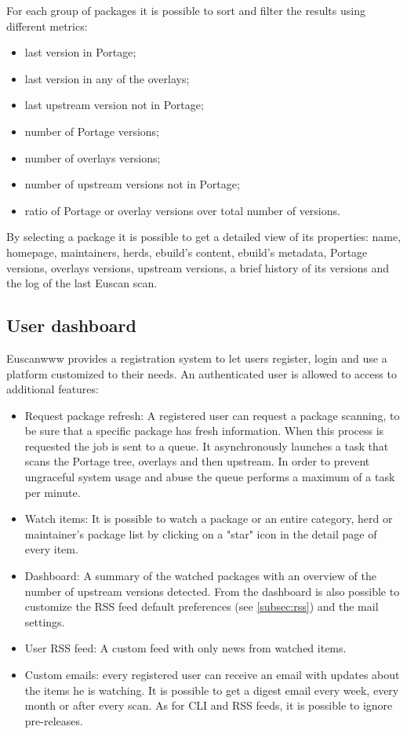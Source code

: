 For each group of packages it is possible to sort and filter the results using different metrics:

\begin{itemize}
\item last version in Portage;
\item last version in any of the overlays;
\item last upstream version not in Portage;
\item number of Portage versions;
\item number of overlays versions;
\item number of upstream versions not in Portage;
\item ratio of Portage or overlay versions over total number of versions.
\end{itemize}

By selecting a package it is possible to get a detailed view of its properties: name, homepage, maintainers, herds, ebuild's content, ebuild's metadata, Portage versions, overlays versions, upstream versions, a brief history of its versions and the log of the last Euscan scan.


\subsection{User dashboard}
Euscanwww provides a registration system to let users register, login and use a platform customized to their needs. An authenticated user is allowed to access to additional features:

\begin{itemize}
\item Request package refresh: A registered user can request a package scanning, to be sure that a specific package has fresh information. When this process is requested the job is sent to a queue. It asynchronously launches a task that scans the Portage tree, overlays and then upstream. In order to prevent ungraceful system usage and abuse the queue performs a maximum of a task per minute.

\item Watch items: It is possible to watch a package or an entire category, herd or maintainer's package list by clicking on a "star" icon in the detail page of every item.

\item Dashboard: A summary of the watched packages with an overview of the number of upstream versions detected. From the dashboard is also possible to customize the RSS feed default preferences (see \ref{subsec:rss}) and the mail settings.

\item User RSS feed: A custom feed with only news from watched items.

\item Custom emails: every registered user can receive an email with updates about the items he is watching. It is possible to get a digest email every week, every month or after every scan. As for CLI and RSS feeds, it is possible to ignore pre-releases.
\end{itemize}

